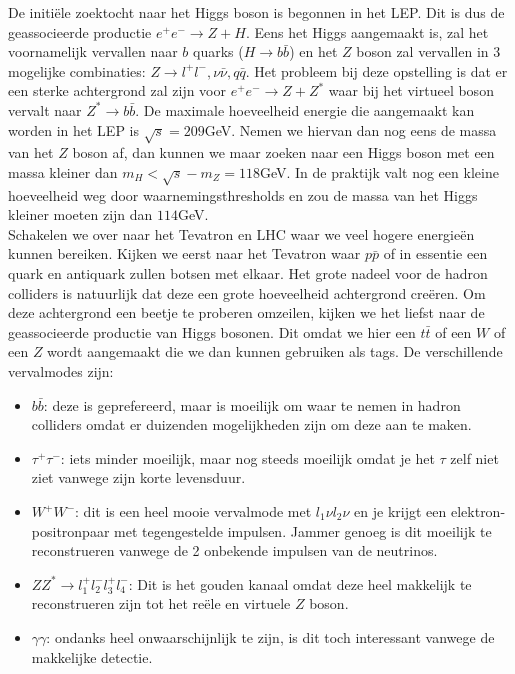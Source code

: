 \documentclass[../main.tex]{subfiles}
\begin{document}
De initiële zoektocht naar het Higgs boson is begonnen in het LEP. Dit is dus de geassocieerde productie $e^{+} e^{-} \rightarrow Z+H$. Eens het Higgs aangemaakt is, zal het voornamelijk vervallen naar $b$ quarks ($H \rightarrow b \bar{b}$) en het $Z$ boson zal vervallen in 3 mogelijke combinaties: $Z \rightarrow l^{+} l^{-}, \nu \bar{\nu}, q \bar{q}$. Het probleem bij deze opstelling is dat er een sterke achtergrond zal zijn voor $e^{+} e^{-} \rightarrow Z+Z^{*}$ waar bij het virtueel boson vervalt naar $Z^{*} \rightarrow b \bar{b}$. De maximale hoeveelheid energie die aangemaakt kan worden in het LEP is $\sqrt{s} = 209$GeV. Nemen we hiervan dan nog eens de massa van het $Z$ boson af, dan kunnen we maar zoeken naar een Higgs boson met een massa kleiner dan $m_{H}<\sqrt{s}-m_{Z}=118$GeV. In de praktijk valt nog een kleine hoeveelheid weg door waarnemingsthresholds en zou de massa van het Higgs kleiner moeten zijn dan $114$GeV.\\
Schakelen we over naar het Tevatron en LHC waar we veel hogere energieën kunnen bereiken. Kijken we eerst naar het Tevatron waar $p\bar{p}$ of in essentie een quark en antiquark zullen botsen met elkaar. Het grote nadeel voor de hadron colliders is natuurlijk dat deze een grote hoeveelheid achtergrond creëren. Om deze achtergrond een beetje te proberen omzeilen, kijken we het liefst naar de geassocieerde productie van Higgs bosonen. Dit omdat we hier een $t\bar{t}$ of een $W$ of een $Z$ wordt aangemaakt die we dan kunnen gebruiken als tags. De verschillende vervalmodes zijn:
\begin{itemize}
    \item $b\bar{b}$: deze is geprefereerd, maar is moeilijk om waar te nemen in hadron colliders omdat er duizenden mogelijkheden zijn om deze aan te maken.
    \item $\tau^{+} \tau^{-}$: iets minder moeilijk, maar nog steeds moeilijk omdat je het $\tau$ zelf niet ziet vanwege zijn korte levensduur.
    \item $W^+W^-$: dit is een heel mooie vervalmode met $l_{1} \nu l_{2} \nu$ en je krijgt een elektron-positronpaar met tegengestelde impulsen. Jammer genoeg is dit moeilijk te reconstrueren vanwege de 2 onbekende impulsen van de neutrinos.
    \item $Z Z^{*} \rightarrow l_{1}^{+} l_{2}^{-} l_{3}^{+} l_{4}^{-}$: Dit is het gouden kanaal omdat deze heel makkelijk te reconstrueren zijn tot het reële en virtuele $Z$ boson.
    \item $\gamma\gamma$: ondanks heel onwaarschijnlijk te zijn, is dit toch interessant vanwege de makkelijke detectie.
\end{itemize}
\end{document}
